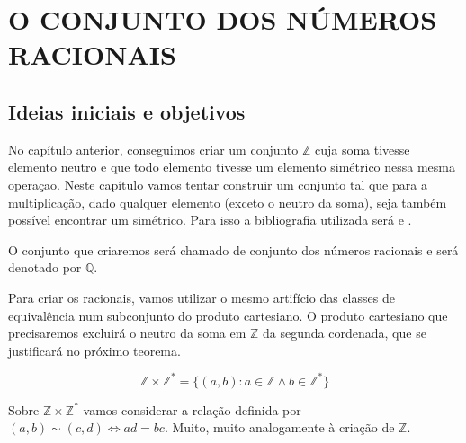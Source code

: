 \documentclass[../main.tex]{subfiles}
\begin{document}
\chapter{O CONJUNTO DOS NÚMEROS RACIONAIS}
\section{Ideias iniciais e objetivos}

No capítulo anterior, conseguimos criar um conjunto $\mathbb{Z}$ cuja soma tivesse elemento neutro e que todo elemento tivesse um elemento simétrico nessa mesma operaçao. Neste capítulo vamos tentar construir um conjunto tal que para a multiplicação, dado qualquer elemento (exceto o neutro da soma), seja também possível encontrar um simétrico. Para isso a bibliografia utilizada será \parencite{domingues-2009} e \parencite{ferreira}.

O conjunto que criaremos será chamado de conjunto dos números racionais e será denotado por $\mathbb{Q}$.

Para criar os racionais, vamos utilizar o mesmo artifício das classes de equivalência num subconjunto do produto cartesiano. O produto cartesiano que precisaremos excluirá o neutro da soma em $\mathbb{Z}$ da segunda cordenada, que se justificará no próximo teorema.

$$\mathbb{Z} \times \mathbb{Z}^* = \{ \left( a,b \right) : a \in \mathbb{Z} \land b \in \mathbb{Z}^* \}$$

Sobre $\mathbb{Z} \times \mathbb{Z}^*$ vamos considerar a relação definida por $\left( a,b \right) \sim \left( c,d \right) \iff ad = bc$. Muito, muito analogamente à criação de $\mathbb{Z}$.
\end{document}
